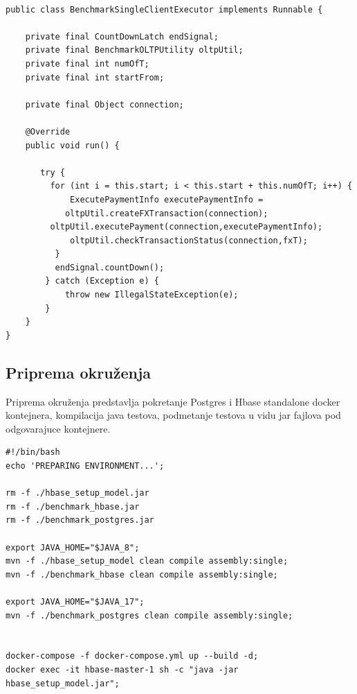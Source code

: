 \documentclass[12pt,oneside]{memoir}
\begin{document}
\begin{lstlisting}[title={BenchmarkSIngleClientExecutor.java},captionpos=t]

public class BenchmarkSingleClientExecutor implements Runnable {

    private final CountDownLatch endSignal;
    private final BenchmarkOLTPUtility oltpUtil;
    private final int numOfT;
    private final int startFrom;

    private final Object connection;

    @Override
    public void run() {

       try {
         for (int i = this.start; i < this.start + this.numOfT; i++) {
             ExecutePaymentInfo executePaymentInfo = 
	        oltpUtil.createFXTransaction(connection);
	     oltpUtil.executePayment(connection,executePaymentInfo);
             oltpUtil.checkTransactionStatus(connection,fxT);
          }
          endSignal.countDown();
        } catch (Exception e) {
            throw new IllegalStateException(e);
        }
    }
}

\end{lstlisting}



\subsection{Priprema okruženja}

Priprema okruženja predstavlja pokretanje Postgres i Hbase standalone docker kontejnera, kompilacija java testova, podmetanje testova u vidu jar fajlova pod odgovarajuce kontejnere.


\begin{lstlisting}[title={prepareEnv.sh},captionpos=t]
#!/bin/bash
echo 'PREPARING ENVIRONMENT...';

rm -f ./hbase_setup_model.jar
rm -f ./benchmark_hbase.jar
rm -f ./benchmark_postgres.jar

export JAVA_HOME="$JAVA_8";
mvn -f ./hbase_setup_model clean compile assembly:single;
mvn -f ./benchmark_hbase clean compile assembly:single;

export JAVA_HOME="$JAVA_17";
mvn -f ./benchmark_postgres clean compile assembly:single;


docker-compose -f docker-compose.yml up --build -d;
docker exec -it hbase-master-1 sh -c "java -jar hbase_setup_model.jar";

\end{lstlisting}
\end{document}
